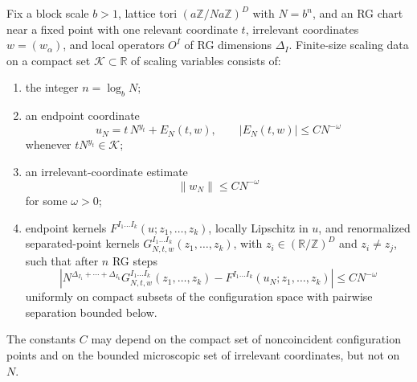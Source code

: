 \begin{definition}
\label{def:finite-size-scaling-data}
Fix a block scale \(b>1\), lattice tori
\((a\mathbb Z/Na\mathbb Z)^D\) with \(N=b^n\), and an RG chart near a
fixed point with one relevant coordinate \(t\), irrelevant coordinates
\(w=(w_\alpha)\), and local operators \(O^I\) of RG dimensions
\(\Delta_I\).  Finite-size scaling data on a compact set
\(\mathcal K\subset\mathbb R\) of scaling variables consists of:
\begin{enumerate}[label=(\roman*)]
  \item the integer \(n=\log_b N\);
  \item an endpoint coordinate
  \[
    u_N=t\,N^{y_t}+E_N(t,w),
    \qquad |E_N(t,w)|\le C N^{-\omega}
  \]
  whenever \(tN^{y_t}\in\mathcal K\);
  \item an irrelevant-coordinate estimate
  \[
    \|w_N\|\le C N^{-\omega}
  \]
  for some \(\omega>0\);
  \item endpoint kernels
  \(F^{I_1\ldots I_k}(u;z_1,\ldots,z_k)\), locally Lipschitz in \(u\),
  and renormalized separated-point kernels
  \(G_{N,t,w}^{I_1\ldots I_k}(z_1,\ldots,z_k)\), with
  \(z_i\in(\mathbb R/\mathbb Z)^D\) and \(z_i\ne z_j\), such that after
  \(n\) RG steps
  \[
    \left|
    N^{\Delta_{I_1}+\cdots+\Delta_{I_k}}
    G_{N,t,w}^{I_1\ldots I_k}(z_1,\ldots,z_k)
    -
    F^{I_1\ldots I_k}(u_N;z_1,\ldots,z_k)
    \right|
    \le C N^{-\omega}
  \]
  uniformly on compact subsets of the configuration space with pairwise
  separation bounded below.
\end{enumerate}
The constants \(C\) may depend on the compact set of noncoincident
configuration points and on the bounded microscopic set of irrelevant
coordinates, but not on \(N\).
\end{definition}

